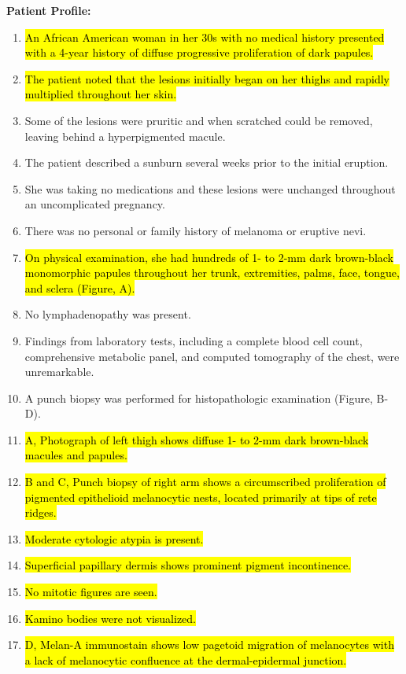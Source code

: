 \documentclass[11pt]{article}
\newcommand{\traineeHigh}[1]{\hl{#1}}
\begin{document}
\begin{tcolorbox}[colback=blue!3!white, colframe=blue!50!white,
                  title=Example of QA Data (from JAMA QA ID1076), left=10mm, breakable]
\small

\textbf{Patient Profile:}
\begin{enumerate}
  \item \traineeHigh{An African American woman in her 30s with no medical history presented with a 4-year history of diffuse progressive proliferation of dark papules.}
  \item \traineeHigh{The patient noted that the lesions initially began on her thighs and rapidly multiplied throughout her skin.}
  \item Some of the lesions were pruritic and when scratched could be removed, leaving behind a hyperpigmented macule.
  \item The patient described a sunburn several weeks prior to the initial eruption.
  \item She was taking no medications and these lesions were unchanged throughout an uncomplicated pregnancy.
  \item There was no personal or family history of melanoma or eruptive nevi.
  \item \traineeHigh{On physical examination, she had hundreds of 1- to 2-mm dark brown-black monomorphic papules throughout her trunk, extremities, palms, face, tongue, and sclera (Figure, A).}
  \item No lymphadenopathy was present.
  \item Findings from laboratory tests, including a complete blood cell count, comprehensive metabolic panel, and computed tomography of the chest, were unremarkable.
  \item A punch biopsy was performed for histopathologic examination (Figure, B-D).
  \item \traineeHigh{A, Photograph of left thigh shows diffuse 1- to 2-mm dark brown-black macules and papules.}
  \item \traineeHigh{B and C, Punch biopsy of right arm shows a circumscribed proliferation of pigmented epithelioid melanocytic nests, located primarily at tips of rete ridges.}
  \item \traineeHigh{Moderate cytologic atypia is present.}
  \item \traineeHigh{Superficial papillary dermis shows prominent pigment incontinence.}
  \item \traineeHigh{No mitotic figures are seen.}
  \item \traineeHigh{Kamino bodies were not visualized.}
  \item \traineeHigh{D, Melan-A immunostain shows low pagetoid migration of melanocytes with a lack of melanocytic confluence at the dermal-epidermal junction.}
\end{enumerate}


\end{tcolorbox}
\end{document}
